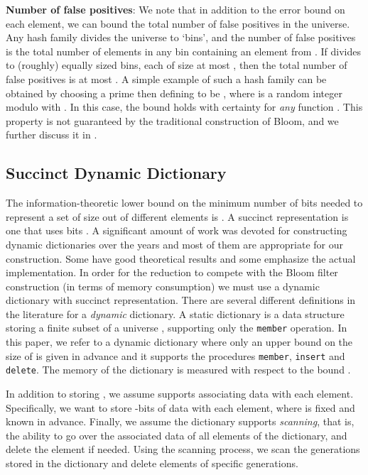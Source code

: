 \documentclass[11pt]{article}
\begin{document}
\noindent
\textbf{Number of false positives}:
We note that in addition to the error bound on each element, we can bound the total number of false positives in the universe. Any hash family  divides the universe to  `bins', and the number of false positives is the total number of elements in any bin containing an element from . If  divides  to (roughly) equally sized bins, each of size at most , then the total number of false positives is at most . A simple example of such a hash family can be obtained by choosing a prime  then defining  to be , where  is a random integer modulo  with  \cite{CarterW79}. In this case, the bound holds with certainty for \emph{any} function . This property is not guaranteed by the traditional construction of Bloom, and we further discuss it in .

\subsection{Succinct Dynamic Dictionary}
The information-theoretic lower bound on the minimum number of bits needed to represent a set  of size  out of  different elements is . A succinct representation is one that uses  bits \cite{Dem07}. A significant amount of work was devoted for constructing dynamic dictionaries over the years and most of them are appropriate for our construction. Some have good theoretical results and some emphasize the actual implementation. In order for the reduction to compete with the Bloom filter construction (in terms of memory consumption) we must use a dynamic dictionary with succinct representation. There are several different definitions in the literature for a \emph{dynamic} dictionary. A static dictionary is a data structure storing a finite subset of a universe , supporting only the \texttt{member} operation. In this paper, we refer to a dynamic dictionary where only an upper bound  on the size of  is given in advance and it supports the procedures \texttt{member}, \texttt{insert} and \texttt{delete}. The memory of the dictionary is measured with respect to the bound .

In addition to storing , we assume  supports associating data with each element. Specifically, we want to store -bits of data with each element, where  is fixed and known in advance. Finally, we assume the dictionary supports \emph{scanning}, that is, the ability to go over the associated data of all elements of the dictionary, and delete the element if needed. Using the scanning process, we scan the generations stored in the dictionary and delete elements of specific generations.
\end{document}
